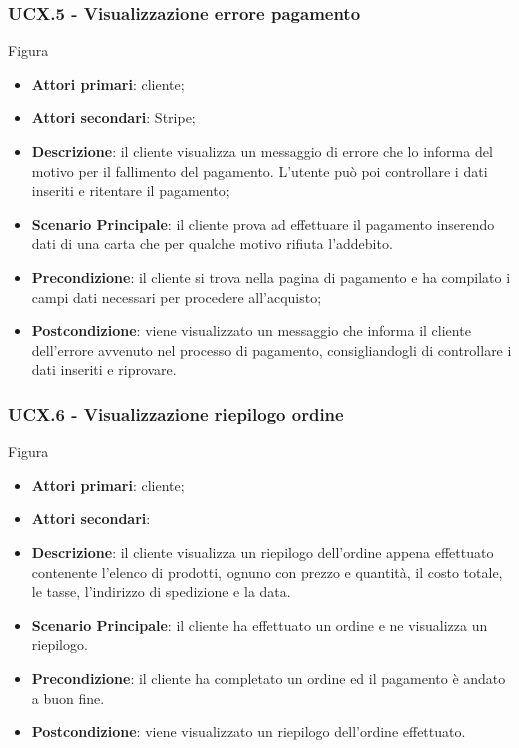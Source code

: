 \subsubsection{UCX.5 - Visualizzazione errore pagamento}
Figura \\
\begin{itemize}
\item \textbf{Attori primari}: cliente;
\item \textbf{Attori secondari}: Stripe;
\item \textbf{Descrizione}: il cliente visualizza un messaggio di errore che lo informa del motivo per il fallimento del pagamento. L'utente può poi controllare i dati inseriti e ritentare il pagamento;
\item \textbf{Scenario Principale}: il cliente prova ad effettuare il pagamento inserendo dati di una carta che per qualche motivo rifiuta l'addebito.
\item \textbf{Precondizione}: il cliente si trova nella pagina di pagamento e ha compilato i campi dati necessari per procedere all'acquisto;
\item \textbf{Postcondizione}: viene visualizzato un messaggio che informa il cliente dell'errore avvenuto nel processo di pagamento, consigliandogli di controllare i dati inseriti e riprovare.
\end{itemize}

\subsubsection{UCX.6 - Visualizzazione riepilogo ordine}
Figura \\
\begin{itemize}
\item \textbf{Attori primari}: cliente;
\item \textbf{Attori secondari}:
\item \textbf{Descrizione}: il cliente visualizza un riepilogo dell'ordine appena effettuato contenente l'elenco di prodotti, ognuno con prezzo e quantità, il costo totale, le tasse, l'indirizzo di spedizione e la data.
\item \textbf{Scenario Principale}: il cliente ha effettuato un ordine e ne visualizza un riepilogo.
\item \textbf{Precondizione}: il cliente ha completato un ordine ed il pagamento è andato a buon fine.
\item \textbf{Postcondizione}: viene visualizzato un riepilogo dell'ordine effettuato.
\end{itemize}

